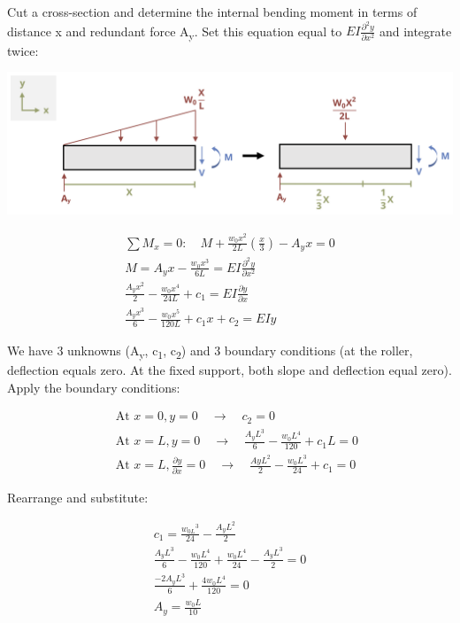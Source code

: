 \documentclass[
  letterpaper,
  DIV=11,
  numbers=noendperiod]{scrreprt}
\theoremstyle{definition}
\theoremstyle{remark}
\begin{document}
\begin{tcolorbox}
\begin{tcolorbox}
Cut a cross-section and determine the internal bending moment in terms
of distance x and redundant force A\textsubscript{y}. Set this equation
equal to \(EI\frac{\partial^2 y}{\partial x^2}\) and integrate twice:

\begin{center}
\includegraphics{images/CH11 PNGs/example11.6-3.png}
\end{center}

\[
\begin{gathered} \sum M_x=0: \quad M+\frac{w_0 x^2}{2 L}\left(\frac{x}{3}\right)-A_y x=0 \\ M=A_y x-\frac{w_0 x^3}{6 L}=EI \frac{\partial^2 y}{\partial x^2} \\ \frac{A_y x^2}{2}-\frac{w_0 x^4}{24 L}+c_1=E I \frac{\partial y}{\partial x} \\ \frac{A_y x^3}{6}-\frac{w_0 x^5}{120 L}+c_1 x+c_2=E I y\end{gathered}
\]

We have 3 unknowns (A\textsubscript{y}, c\textsubscript{1},
c\textsubscript{2}) and 3 boundary conditions (at the roller, deflection
equals zero. At the fixed support, both slope and deflection equal
zero). Apply the boundary conditions:

\[
\begin{aligned} & \text { At } x=0, y=0 \quad \rightarrow \quad c_2=0 \\ & \text { At } x=L, y=0 \quad \rightarrow \quad \frac{A_y L^3}{6}-\frac{w_0 L^4}{120}+c_1 L=0 \\ & \text { At } x=L, \frac{\partial y}{\partial x}=0 \quad \rightarrow \quad \frac{A y L^2}{2}-\frac{w_0 L^3}{24}+c_1=0\end{aligned}
\]

Rearrange and substitute:

\[
\begin{gathered}c_1=\frac{w_{0 L}{ }^3}{24}-\frac{A_y L^2}{2} \\ \frac{A_y L^3}{6}-\frac{w_0 L^4}{120}+\frac{w_0 L^4}{24}-\frac{A_y L^3}{2}=0 \\ \frac{-2 A_y L^3}{6}+\frac{4 w_{0} L^4}{120}=0 \\ A_y=\frac{w_0 L}{10}\end{gathered}
\]


\end{tcolorbox}
\end{tcolorbox}
\end{document}
